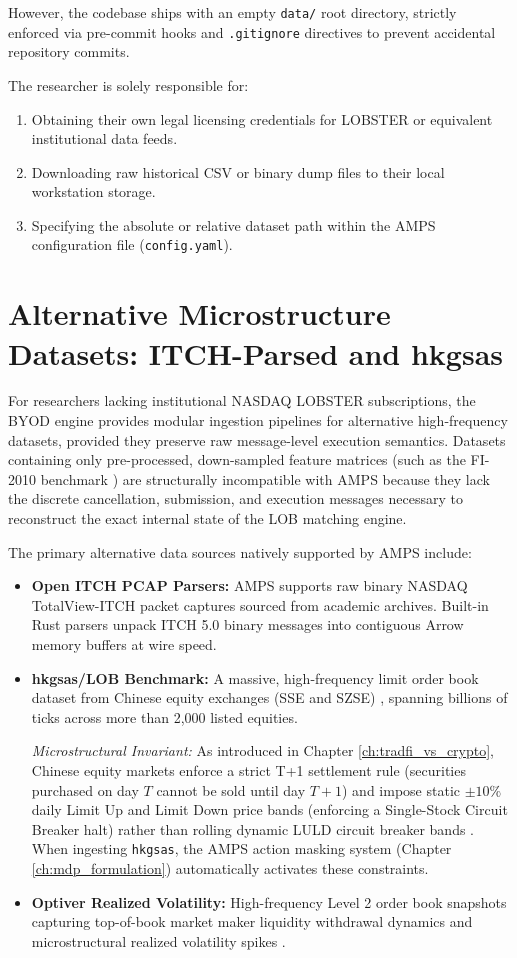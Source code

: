 However, the codebase ships with an empty \texttt{data/} root directory, strictly enforced via pre-commit hooks and \texttt{.gitignore} directives to prevent accidental repository commits.

The researcher is solely responsible for:
\begin{enumerate}
    \item Obtaining their own legal licensing credentials for LOBSTER or equivalent institutional data feeds.
    \item Downloading raw historical CSV or binary dump files to their local workstation storage.
    \item Specifying the absolute or relative dataset path within the AMPS configuration file (\texttt{config.yaml}).
\end{enumerate}

\section{Alternative Microstructure Datasets: ITCH-Parsed and hkgsas}

For researchers lacking institutional NASDAQ LOBSTER subscriptions, the BYOD engine provides modular ingestion pipelines for alternative high-frequency datasets, provided they preserve raw message-level execution semantics. Datasets containing only pre-processed, down-sampled feature matrices (such as the FI-2010 benchmark \cite{ntakaris2018benchmark}) are structurally incompatible with AMPS because they lack the discrete cancellation, submission, and execution messages necessary to reconstruct the exact internal state of the LOB matching engine.

The primary alternative data sources natively supported by AMPS include:
\begin{itemize}
    \item \textbf{Open ITCH PCAP Parsers:} AMPS supports raw binary NASDAQ TotalView-ITCH packet captures sourced from academic archives. Built-in Rust parsers unpack ITCH 5.0 binary messages into contiguous Arrow memory buffers at wire speed.
    \item \textbf{hkgsas/LOB Benchmark:} A massive, high-frequency limit order book dataset from Chinese equity exchanges (SSE and SZSE) \cite{hkgsas2020benchmark}, spanning billions of ticks across more than 2,000 listed equities. 
    
    \textit{Microstructural Invariant:} As introduced in Chapter \ref{ch:tradfi_vs_crypto}, Chinese equity markets enforce a strict T+1 settlement rule (securities purchased on day $T$ cannot be sold until day $T+1$) and impose static $\pm10\%$ daily Limit Up and Limit Down price bands (enforcing a Single-Stock Circuit Breaker halt) rather than rolling dynamic LULD circuit breaker bands \cite{sec2012luld}. When ingesting \texttt{hkgsas}, the AMPS action masking system (Chapter \ref{ch:mdp_formulation}) automatically activates these constraints.
    \item \textbf{Optiver Realized Volatility:} High-frequency Level 2 order book snapshots capturing top-of-book market maker liquidity withdrawal dynamics and microstructural realized volatility spikes \cite{optiver2021realized}.
\end{itemize}

